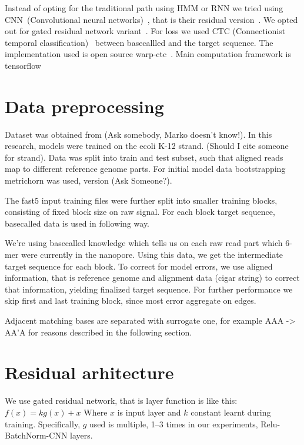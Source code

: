 \documentclass[times, utf8, seminar, numeric]{fer}
\begin{document}
Instead of opting for the traditional path using HMM or RNN we tried using CNN~(Convolutional neural networks)~\cite{lecun-98}, that is their residual version~\cite{he2016deep}. We opted out for gated residual network variant~\cite{savarese2016learning}. For loss we used CTC (Connectionist temporal classification)~\cite{graves2006connectionist} between basecallled and the target sequence. The implementation used is open source warp-ctc~\cite{warpctc}. Main computation framework is tensorflow~\cite{tensorflow2015-whitepaper}

\section{Data preprocessing}

Dataset was obtained from (Ask somebody, Marko doesn't know!). In this research, models were trained on the ecoli K-12 strand. (Should I cite someone for strand). Data was split into train and test subset, such that aligned reads map to different reference genome parts. For initial model data bootstrapping metrichorn was used, version (Ask Someone?).

The fast5 input training files were further split into smaller training blocks, consisting of fixed block size on raw signal. For each block target sequence, basecalled data is used in following way.

We're using basecalled knowledge which tells us on each raw read part which 6-mer were currently in the nanopore. Using this data, we get the intermediate target sequence for each block. To correct for model errors, we use aligned information, that is reference genome and alignment data (cigar string) to correct that information, yielding finalized target sequence. For further performance we skip first and last training block, since most error aggregate on edges.

Adjacent matching bases are separated with surrogate one, for example AAA -> AA'A for reasons described in the following section.

\section{Residual arhitecture}

We use gated residual network, that is layer function is like this: $f(x) = k g(x) + x$ Where $x$ is input layer and $k$ constant learnt during training. Specifically, $g$ used is multiple, 1--3 times in our experiments, Relu-BatchNorm-CNN layers.
\end{document}

